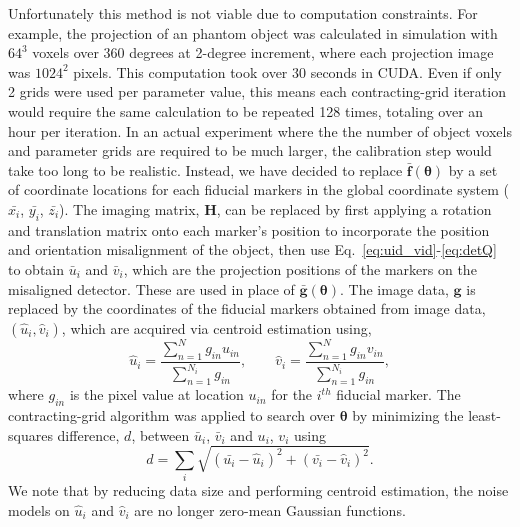 Unfortunately this method is not viable due to computation constraints.  For example, the projection of an phantom object was calculated in simulation with $64^3$ voxels over 360 degrees at 2-degree increment, where each projection image was $1024^2$ pixels.  This computation took over 30 seconds in CUDA.  Even if only 2 grids were used per parameter value, this means each contracting-grid iteration would require the same calculation to be repeated 128 times, totaling over an hour per iteration.  In an actual experiment where the the number of object voxels and parameter grids are required to be much larger, the calibration step would take too long to be realistic.  Instead, we have decided to replace $\mathrm{\mathbf{\bar{f}}}( \boldsymbol{\theta})$ by a set of coordinate locations for each fiducial markers in the global coordinate system ($\bar{x_i}$, $\bar{y_i}$, $\bar{z_i}$).  The imaging matrix, $\mathrm{\mathbf{H}}$, can be replaced by first applying a rotation and translation matrix onto each marker's position to incorporate the position and orientation misalignment of the object, then use Eq.~\ref{eq:uid_vid}-\ref{eq:detQ} to obtain $\bar{u}_i$ and $\bar{v}_i$, which are the projection positions of the markers on the misaligned detector.  These are used in place of $\mathrm{\mathbf{\bar{g}}}( \boldsymbol{\theta})$.  The image data, $\mathrm{\mathbf{g}}$ is replaced by the coordinates of the fiducial markers obtained from image data, $(\hat{u}_i, \hat{v}_i)$, which are acquired via centroid estimation using,
%
\begin{equation}
\label{eq:centroid_estimation}
\hat{u}_i = \frac{\sum\limits_{n = 1}^{N} g_{in} u_{in}}{\sum\limits_{n = 1}^{N_i} g_{in}}, \qquad
\hat{v}_i = \frac{\sum\limits_{n = 1}^{N} g_{in} v_{in}}{\sum\limits_{n = 1}^{N_i} g_{in}},
\end{equation}
%
where $g_{in}$ is the pixel value at location $u_{in}$ for the $i^{th}$ fiducial marker.  The contracting-grid algorithm was applied to search over $\boldsymbol{\theta}$ by minimizing the least-squares difference, $d$, between $\bar{u}_i$, $\bar{v}_i$ and $u_i$, $v_i$ using
%
\begin{equation}
d = \sum\limits_i \sqrt{ ( \bar{u_i} - \hat{u}_i )^2 + ( \bar{v_i} - \hat{v}_i)^2 }.
\end{equation}
%
We note that by reducing data size and performing centroid estimation, the noise models on $\hat{u}_i$ and $\hat{v}_i$ are no longer zero-mean Gaussian functions.

